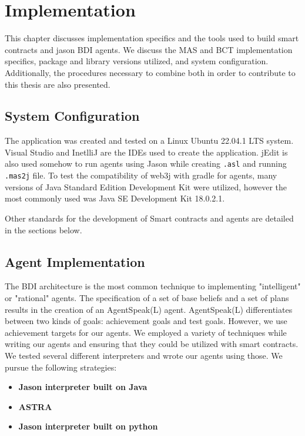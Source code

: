 \chapter{Implementation}

This chapter discusses implementation specifics and the tools used to build smart contracts and jason \ac{BDI} agents. We discuss the \ac{MAS} and \ac{BCT} implementation specifics, package and library versions utilized, and system configuration. Additionally, the procedures necessary to combine both in order to contribute to this thesis are also presented.

\section{System Configuration}

The application was created and tested on a Linux Ubuntu 22.04.1 LTS system.
Visual Studio and InetlliJ are the \ac{IDE}s used to create the application. jEdit is also used somehow to run agents using Jason while creating \texttt{.asl} and running \texttt{.mas2j} file.
To test the compatibility of web3j with gradle for agents, many versions of Java Standard Edition Development Kit were utilized, however the most commonly used was Java SE Development Kit 18.0.2.1. 

\vspace{.5cm}

Other standards for the development of Smart contracts and agents are detailed in the sections below.

\section{Agent Implementation}

The \ac{BDI} architecture is the most common technique to implementing "intelligent" or "rational" agents. The specification of a set of base beliefs and a set of plans results in the creation of an AgentSpeak(L) agent. AgentSpeak(L) differentiates between two kinds of goals: achievement goals and test goals. However, we use achievement targets for our agents. We employed a variety of techniques while writing our agents and ensuring that they could be utilized with smart contracts. We tested several different interpreters and wrote our agents using those. We pursue the following strategies:

\begin{itemize}
    \item \textbf{Jason interpreter built on Java}
    \item \textbf{\ac{ASTRA}}
    \item \textbf{Jason interpreter built on python}
\end{itemize}

